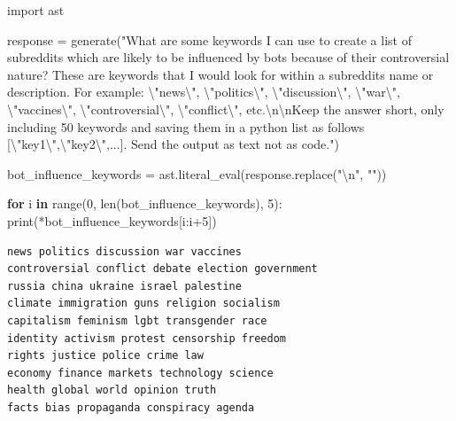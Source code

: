 \documentclass[
  12pt,
  letterpaper,
  DIV=11,
  numbers=noendperiod,
  abstract]{scrartcl}
\newenvironment{Shaded}{\begin{snugshade}}{\end{snugshade}}
\newcommand{\BuiltInTok}[1]{\textcolor[rgb]{0.00,0.23,0.31}{#1}}
\newcommand{\CharTok}[1]{\textcolor[rgb]{0.13,0.47,0.30}{#1}}
\newcommand{\ControlFlowTok}[1]{\textcolor[rgb]{0.00,0.23,0.31}{\textbf{#1}}}
\newcommand{\DecValTok}[1]{\textcolor[rgb]{0.68,0.00,0.00}{#1}}
\newcommand{\ImportTok}[1]{\textcolor[rgb]{0.00,0.46,0.62}{#1}}
\newcommand{\KeywordTok}[1]{\textcolor[rgb]{0.00,0.23,0.31}{\textbf{#1}}}
\newcommand{\NormalTok}[1]{\textcolor[rgb]{0.00,0.23,0.31}{#1}}
\newcommand{\OperatorTok}[1]{\textcolor[rgb]{0.37,0.37,0.37}{#1}}
\newcommand{\StringTok}[1]{\textcolor[rgb]{0.13,0.47,0.30}{#1}}
\begin{document}
\begin{Shaded}
\begin{Highlighting}[]
\ImportTok{import}\NormalTok{ ast}

\NormalTok{response }\OperatorTok{=}\NormalTok{ generate(}\StringTok{"What are some keywords I can use to create a list of subreddits which are likely to be influenced by bots because of their controversial nature? These are keywords that I would look for within a subreddit\textquotesingle{}s name or description. For example: }\CharTok{\textbackslash{}"}\StringTok{news}\CharTok{\textbackslash{}"}\StringTok{, }\CharTok{\textbackslash{}"}\StringTok{politics}\CharTok{\textbackslash{}"}\StringTok{, }\CharTok{\textbackslash{}"}\StringTok{discussion}\CharTok{\textbackslash{}"}\StringTok{, }\CharTok{\textbackslash{}"}\StringTok{war}\CharTok{\textbackslash{}"}\StringTok{, }\CharTok{\textbackslash{}"}\StringTok{vaccines}\CharTok{\textbackslash{}"}\StringTok{, }\CharTok{\textbackslash{}"}\StringTok{controversial}\CharTok{\textbackslash{}"}\StringTok{, }\CharTok{\textbackslash{}"}\StringTok{conflict}\CharTok{\textbackslash{}"}\StringTok{, etc.}\CharTok{\textbackslash{}n\textbackslash{}n}\StringTok{Keep the answer short, only including 50 keywords and saving them in a python list as follows [}\CharTok{\textbackslash{}"}\StringTok{key1}\CharTok{\textbackslash{}"}\StringTok{,}\CharTok{\textbackslash{}"}\StringTok{key2}\CharTok{\textbackslash{}"}\StringTok{,...]. Send the output as text not as code."}\NormalTok{)}

\NormalTok{bot\_influence\_keywords }\OperatorTok{=}\NormalTok{ ast.literal\_eval(response.replace(}\StringTok{"}\CharTok{\textbackslash{}n}\StringTok{"}\NormalTok{, }\StringTok{""}\NormalTok{))}

\ControlFlowTok{for}\NormalTok{ i }\KeywordTok{in} \BuiltInTok{range}\NormalTok{(}\DecValTok{0}\NormalTok{, }\BuiltInTok{len}\NormalTok{(bot\_influence\_keywords), }\DecValTok{5}\NormalTok{):}
    \BuiltInTok{print}\NormalTok{(}\OperatorTok{*}\NormalTok{bot\_influence\_keywords[i:i}\OperatorTok{+}\DecValTok{5}\NormalTok{])}
\end{Highlighting}
\end{Shaded}

\begin{verbatim}
news politics discussion war vaccines
controversial conflict debate election government
russia china ukraine israel palestine
climate immigration guns religion socialism
capitalism feminism lgbt transgender race
identity activism protest censorship freedom
rights justice police crime law
economy finance markets technology science
health global world opinion truth
facts bias propaganda conspiracy agenda
\end{verbatim}
\end{document}
